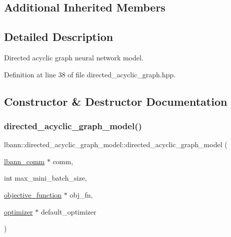 \subsection*{Additional Inherited Members}


\subsection{Detailed Description}
Directed acyclic graph neural network model. 

Definition at line 38 of file directed\+\_\+acyclic\+\_\+graph.\+hpp.



\subsection{Constructor \& Destructor Documentation}
\mbox{\label{classlbann_1_1directed__acyclic__graph__model_a2b5f8058b341073a0a95d4882fb4ff52}} 
\subsubsection{\texorpdfstring{directed\+\_\+acyclic\+\_\+graph\+\_\+model()}{directed\_acyclic\_graph\_model()}\hspace{0.1cm}{\footnotesize\ttfamily [1/2]}}
{\footnotesize\ttfamily lbann\+::directed\+\_\+acyclic\+\_\+graph\+\_\+model\+::directed\+\_\+acyclic\+\_\+graph\+\_\+model (\begin{DoxyParamCaption}\item[{\hyperlink{classlbann_1_1lbann__comm}{lbann\+\_\+comm} $\ast$}]{comm,  }\item[{int}]{max\+\_\+mini\+\_\+batch\+\_\+size,  }\item[{\hyperlink{classlbann_1_1objective__function}{objective\+\_\+function} $\ast$}]{obj\+\_\+fn,  }\item[{\hyperlink{classlbann_1_1optimizer}{optimizer} $\ast$}]{default\+\_\+optimizer }\end{DoxyParamCaption})}

